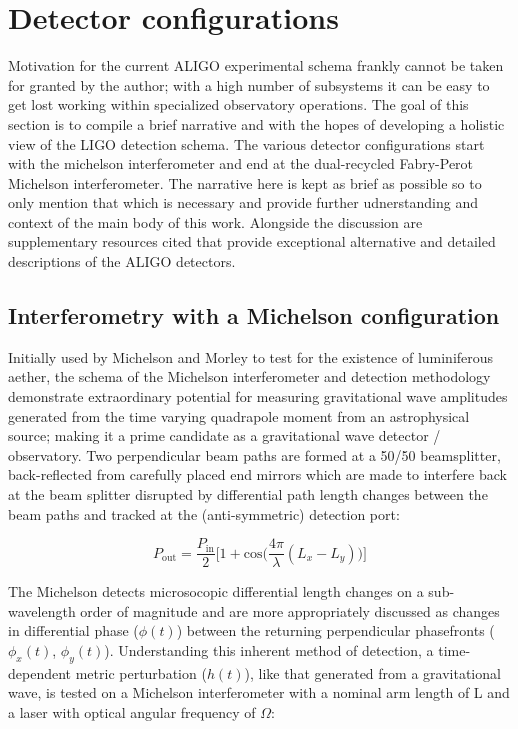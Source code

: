 \section{Detector configurations}
Motivation for the current ALIGO experimental schema frankly cannot be taken for granted by the author; with a high number of subsystems it can be easy to get lost working within specialized observatory operations. The goal of this section is to compile a brief narrative and with the hopes of developing a holistic view of the LIGO detection schema. The various detector configurations start with the michelson interferometer and end at the dual-recycled Fabry-Perot Michelson interferometer. The narrative here is kept as brief as possible so to only mention that which is necessary and provide further udnerstanding and context of the main body of this work. Alongside the discussion are supplementary resources cited that provide exceptional alternative and detailed descriptions of the ALIGO detectors. 

\subsection{Interferometry with a Michelson configuration}
Initially used by Michelson and Morley to test for the existence of luminiferous aether, the schema of the Michelson interferometer and detection methodology demonstrate extraordinary potential for measuring gravitational wave amplitudes generated from the time varying quadrapole moment from an astrophysical source; making it a prime candidate as a gravitational wave detector / observatory. Two perpendicular beam paths are formed at a 50/50 beamsplitter, back-reflected from carefully placed end mirrors which are made to interfere back at the beam splitter disrupted by differential path length changes between the beam paths and tracked at the (anti-symmetric) detection port:

\begin{equation}\label{P_MICH_AS}
	P_\mathrm{out} = \frac{P_\mathrm{in}}{2} \bigg[1+\mathrm{cos}\Big(\frac{4\pi}{\lambda} (L_x - L_y)\Big) \bigg]
\end{equation}

The Michelson detects microsocopic differential length changes on a sub-wavelength order of magnitude and are more appropriately discussed as changes in differential phase ($\phi(t)$) between the returning perpendicular phasefronts ($\phi_x(t)$, $\phi_y(t)$). Understanding this inherent method of detection, a time-dependent metric perturbation ($h(t)$), like that generated from a gravitational wave, is tested on a Michelson interferometer with a nominal arm length of L and a laser with optical angular frequency of $\Omega$:

